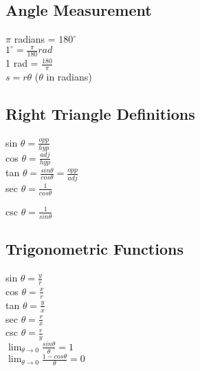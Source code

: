 \documentclass{article}
\begin{document}
	\subsection*{Angle Measurement}
		\begin{center}
		$\pi$ radians = $180^\circ$\\
		
		$1^\circ = \frac{\pi}{180}rad$\\
		
		1 rad = $\frac{180}{\pi}$\\
		
		$s = r\theta$ ($\theta$ in radians)
		\end{center}
	\subsection*{Right Triangle Definitions}
		\begin{center}
		sin $\theta = \frac{opp}{hyp}$\\
		
		cos $\theta = \frac{adj}{hyp}$\\
		
		tan $\theta = \frac{sin \theta}{cos \theta} = \frac{opp}{adj}$\\
		
		sec $\theta = \frac{1}{cos \theta}$ 
		
		csc $\theta = \frac{1}{sin \theta}$
		\end{center}
	\subsection*{Trigonometric Functions}
		\begin{center}
		sin $\theta = \frac{y}{r}$\\
		
		cos $\theta = \frac{x}{r}$\\
		
		tan $\theta = \frac{y}{x}$\\
		
		sec $\theta = \frac{r}{x}$\\
		
		csc $\theta = \frac{r}{y}$\\
		
		$\lim_{\theta \to 0} \frac{sin \theta}{\theta} = 1$\\
		
		$\lim_{\theta \to 0} \frac{1 - cos \theta}{\theta} = 0$
		\end{center}
\end{document}
